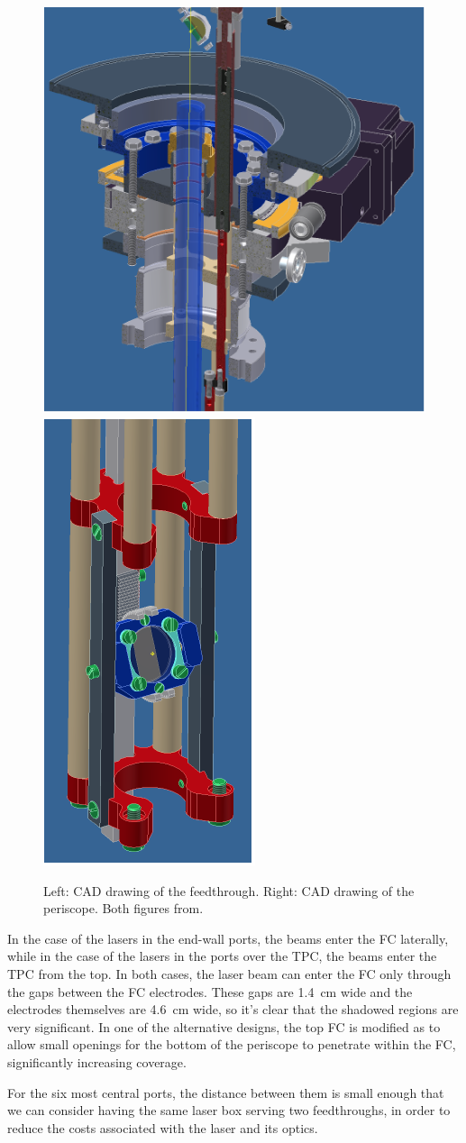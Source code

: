 \begin{figure}[htb!] 
\centering 
\includegraphics[width=0.49\linewidth]{graphics/uB_laser_ft.png}
\includegraphics[width=0.248\linewidth]{graphics/uB_laser_periscope.png}
\caption{Left: CAD drawing of the  feedthrough. Right: CAD drawing of the  periscope. Both figures from\cite{microboone}.}
\label{fig:laser_cad} 
\end{figure} 

In the case of the lasers in the end-wall ports, the beams enter the FC laterally, while in the case of the lasers in the ports over the TPC, the beams enter the TPC from the top. In both cases, the laser beam can enter the FC only through the gaps between the FC electrodes. These gaps are \num{1.4}~cm wide and the electrodes themselves are \num{4.6}~cm wide, so it's clear that the shadowed regions are very significant. In one of the alternative designs, the top FC is modified as to allow small openings for the bottom of the periscope to penetrate within the FC, significantly increasing coverage.

For the six most central ports, the distance between them is small enough that we can consider having the same laser box serving two feedthroughs, in order to reduce the costs associated with the laser and its optics.

